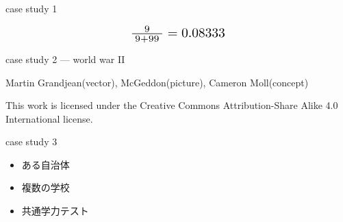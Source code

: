 \documentclass[
  ignorenonframetext,
]{beamer}
\begin{document}
\begin{frame}{case study 1}
\protect\hypertarget{case-study-1-5}{}
\begin{center}\Huge               
\[
 \scalebox{1.4}{$\frac{9}{\;9 + 99\;}=0.08333$}
\]
\end{center}
\end{frame}

\begin{frame}{}
\protect\hypertarget{section-2}{}
\Huge

\scalebox{2}{\textcolor{softblue}{事例2}}
\end{frame}

\begin{frame}{case study 2 --- world war II}
\protect\hypertarget{case-study-2-world-war-ii}{}
\raggedleft


\tiny

\raggedleft

Martin Grandjean(vector), McGeddon(picture), Cameron Moll(concept)

\vspace{-5pt}

This work is licensed under the Creative Commons Attribution-Share Alike
4.0 International license.

\pause

\Huge
\vspace{-120pt}

\vspace{-130pt}
\end{frame}

\begin{frame}{}
\protect\hypertarget{section-3}{}
\Huge

\scalebox{2}{\textcolor{softblue}{事例3}}
\end{frame}

\begin{frame}{case study 3}
\protect\hypertarget{case-study-3}{}
\Huge

\begin{itemize}
\item[\textbullet] ある自治体
\item[\textbullet] 複数の学校
\item[\textbullet] 共通学力テスト
\end{itemize}
\end{frame}
\end{document}
